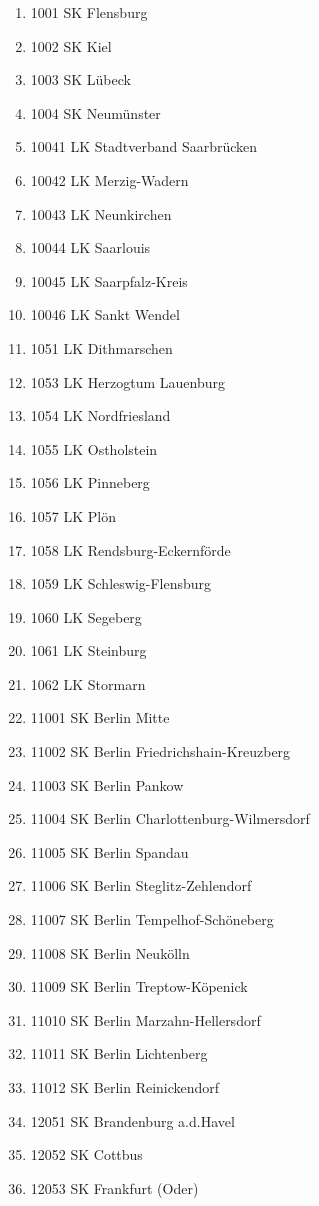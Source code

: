 \begin{enumerate}[itemsep=-6mm]
\item 1001 SK Flensburg
\item 1002 SK Kiel
\item 1003 SK Lübeck
\item 1004 SK Neumünster
\item 10041 LK Stadtverband Saarbrücken
\item 10042 LK Merzig-Wadern
\item 10043 LK Neunkirchen
\item 10044 LK Saarlouis
\item 10045 LK Saarpfalz-Kreis
\item 10046 LK Sankt Wendel
\item 1051 LK Dithmarschen
\item 1053 LK Herzogtum Lauenburg
\item 1054 LK Nordfriesland
\item 1055 LK Ostholstein
\item 1056 LK Pinneberg
\item 1057 LK Plön
\item 1058 LK Rendsburg-Eckernförde
\item 1059 LK Schleswig-Flensburg
\item 1060 LK Segeberg
\item 1061 LK Steinburg
\item 1062 LK Stormarn
\item 11001 SK Berlin Mitte
\item 11002 SK Berlin Friedrichshain-Kreuzberg
\item 11003 SK Berlin Pankow
\item 11004 SK Berlin Charlottenburg-Wilmersdorf
\item 11005 SK Berlin Spandau
\item 11006 SK Berlin Steglitz-Zehlendorf
\item 11007 SK Berlin Tempelhof-Schöneberg
\item 11008 SK Berlin Neukölln
\item 11009 SK Berlin Treptow-Köpenick
\item 11010 SK Berlin Marzahn-Hellersdorf
\item 11011 SK Berlin Lichtenberg
\item 11012 SK Berlin Reinickendorf
\item 12051 SK Brandenburg a.d.Havel
\item 12052 SK Cottbus
\item 12053 SK Frankfurt (Oder)

\end{enumerate}
